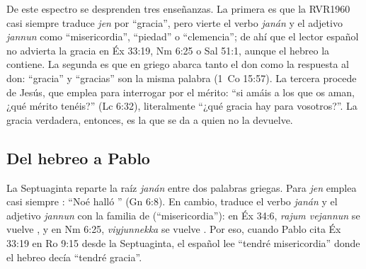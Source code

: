 
De este espectro se desprenden tres enseñanzas. La primera es que la RVR1960 casi siempre traduce \emph{jen} por ``gracia'', pero vierte el verbo \emph{janán} y el adjetivo \emph{jannun} como ``misericordia'', ``piedad'' o ``clemencia''; de ahí que el lector español no advierta la gracia en Éx 33:19, Nm 6:25 o Sal 51:1, aunque el hebreo la contiene. La segunda es que en griego  abarca tanto el don como la respuesta al don: ``gracia'' y ``gracias'' son la misma palabra (1~Co 15:57). La tercera procede de Jesús, que emplea  para interrogar por el mérito: ``si amáis a los que os aman, ¿qué mérito tenéis?'' (Lc 6:32), literalmente ``¿qué gracia hay para vosotros?''. La gracia verdadera, entonces, es la que se da a quien no la devuelve.

\subsection{Del hebreo a Pablo}
La Septuaginta reparte la raíz \emph{janán} entre dos palabras griegas. Para \emph{jen} emplea casi siempre : ``Noé halló '' (Gn 6:8). En cambio, traduce el verbo \emph{janán} y el adjetivo \emph{jannun} con la familia de  (``misericordia''): en Éx 34:6, \emph{rajum vejannun} se vuelve , y en Nm 6:25, \emph{viyjunnekka} se vuelve . Por eso, cuando Pablo cita Éx 33:19 en Ro 9:15 desde la Septuaginta, el español lee ``tendré misericordia'' donde el hebreo decía ``tendré gracia''.

